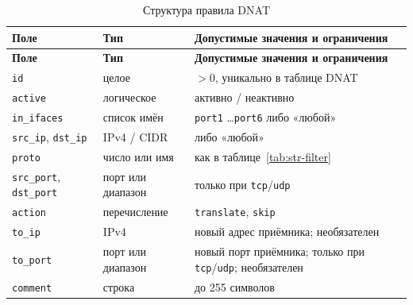 \documentclass[12pt,a4paper,final]{article}
\begin{document}
{\small
\begin{longtable}{|L{3.6cm}|L{3.3cm}|L{7.2cm}|}
\caption{Структура правила DNAT}\label{tab:str-dnat}\\
\hline
\textbf{Поле} & \textbf{Тип} & \textbf{Допустимые значения и ограничения}\\
\hline\endfirsthead
\hline
\textbf{Поле} & \textbf{Тип} & \textbf{Допустимые значения и ограничения}\\
\hline\endhead
\texttt{id} & целое & $>0$, уникально в таблице DNAT\\ \hline
\texttt{active} & логическое & активно / неактивно\\ \hline
\texttt{in\_ifaces} & список имён & \texttt{port1} \dots \texttt{port6} либо «любой»\\ \hline
\texttt{src\_ip}, \texttt{dst\_ip} & IPv4 / CIDR & либо «любой»\\ \hline
\texttt{proto} & число или имя & как в таблице~\ref{tab:str-filter}\\ \hline
\texttt{src\_port}, \texttt{dst\_port} & порт или диапазон & только при \texttt{tcp}/\texttt{udp}\\ \hline
\texttt{action} & перечисление & \texttt{translate}, \texttt{skip}\\ \hline
\texttt{to\_ip} & IPv4 & новый адрес приёмника; необязателен\\ \hline
\texttt{to\_port} & порт или диапазон & новый порт приёмника; только при \texttt{tcp}/\texttt{udp}; необязателен\\ \hline
\texttt{comment} & строка & до 255 символов\\ \hline
\end{longtable}
}
 
\end{document}
